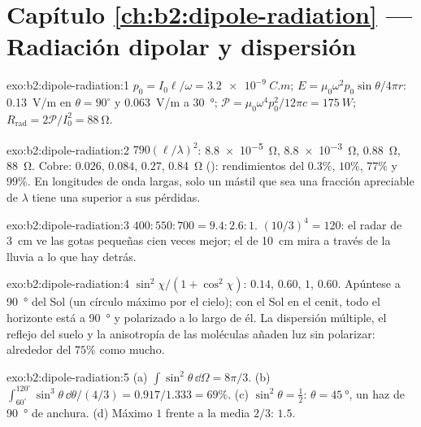 \section*{Capítulo \ref{ch:b2:dipole-radiation} --- Radiación dipolar y dispersión}

\begin{solution}{exo:b2:dipole-radiation:1}
$p_0 = I_0\ell/\omega = \qty{3.2e-9}{C.m}$; $E = \mu_0\omega^2p_0\sin\theta/4\pi r$: \qty{0.13}{V/m}
en $\theta = 90^\circ$ y \qty{0.063}{V/m} a \qty{30}{\degree}; $\mathcal P = \mu_0\omega^4p_0^2/12\pi c =
\qty{175}{W}$; $R_{\text{rad}} = 2\mathcal P/I_0^2 = \qty{88}{\ohm}$.
\end{solution}

\begin{solution}{exo:b2:dipole-radiation:2}
$790(\ell/\lambda)^2$: \qty{8.8e-5}{\ohm}, \qty{8.8e-3}{\ohm}, \qty{0.88}{\ohm}, \qty{88}{\ohm}. Cobre:
$0.026$, $0.084$, $0.27$, \qty{0.84}{\ohm} (): rendimientos del $0.3\%$, $10\%$,
$77\%$ y $99\%$. En longitudes de onda largas, solo un mástil que sea una fracción apreciable de
$\lambda$ tiene una  superior a sus pérdidas.
\end{solution}

\begin{solution}{exo:b2:dipole-radiation:3}
$400 : 550 : 700 = 9.4 : 2.6 : 1$. $(10/3)^4 = 120$: el radar de \qty{3}{cm}
ve las gotas pequeñas cien veces mejor; el de \qty{10}{cm} mira
a través de la lluvia a lo que hay detrás.
\end{solution}

\begin{solution}{exo:b2:dipole-radiation:4}
$\sin^2\chi/(1 + \cos^2\chi)$: $0.14$, $0.60$, $1$, $0.60$. Apúntese a \qty{90}{\degree} del
Sol (un círculo máximo por el cielo); con el Sol en el cenit, todo el
horizonte está a \qty{90}{\degree} y polarizado a lo largo de él. La dispersión múltiple,
el reflejo del suelo y la anisotropía de las moléculas añaden luz sin
polarizar: alrededor del $75\%$ como mucho.
\end{solution}

\begin{solution}{exo:b2:dipole-radiation:5}
(a) $\int\sin^2\theta\,\dd\Omega = 8\pi/3$. (b) $\int_{60^\circ}^{120^\circ}\sin^3\theta\,\dd\theta/
(4/3) = 0.917/1.333 = 69\%$. (c) $\sin^2\theta = \tfrac12$: $\theta = \qty{45}{\degree}$, un
haz de \qty{90}{\degree} de anchura. (d) Máximo $1$ frente a la media $2/3$: $1.5$.
\end{solution}

